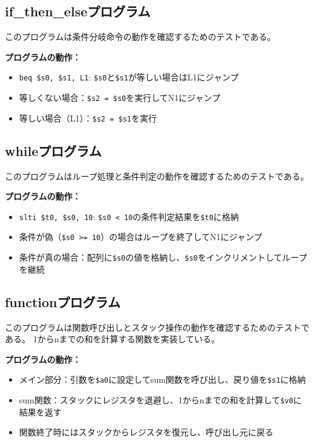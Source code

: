 \documentclass[dvipdfmx]{jsarticle}
\begin{document}
\subsection{if\_then\_elseプログラム}
\label{appendix:if_then_else_asm}
このプログラムは条件分岐命令の動作を確認するためのテストである。



\textbf{プログラムの動作：}
\begin{itemize}
\item \texttt{beq \$s0, \$s1, L1}: \texttt{\$s0}と\texttt{\$s1}が等しい場合はL1にジャンプ
\item 等しくない場合：\texttt{\$s2 = \$s0}を実行してN1にジャンプ
\item 等しい場合（L1）：\texttt{\$s2 = \$s1}を実行
\end{itemize}

\subsection{whileプログラム}
\label{appendix:while_asm}
このプログラムはループ処理と条件判定の動作を確認するためのテストである。



\textbf{プログラムの動作：}
\begin{itemize}
\item \texttt{slti \$t0, \$s0, 10}: \texttt{\$s0 < 10}の条件判定結果を\texttt{\$t0}に格納
\item 条件が偽（\texttt{\$s0 >= 10}）の場合はループを終了してN1にジャンプ
\item 条件が真の場合：配列に\texttt{\$s0}の値を格納し、\texttt{\$s0}をインクリメントしてループを継続
\end{itemize}

\subsection{functionプログラム}
\label{appendix:function_asm}
このプログラムは関数呼び出しとスタック操作の動作を確認するためのテストである。
1からnまでの和を計算する関数を実装している。



\textbf{プログラムの動作：}
\begin{itemize}
\item メイン部分：引数を\texttt{\$a0}に設定してsum関数を呼び出し、戻り値を\texttt{\$s1}に格納
\item sum関数：スタックにレジスタを退避し、1からnまでの和を計算して\texttt{\$v0}に結果を返す
\item 関数終了時にはスタックからレジスタを復元し、呼び出し元に戻る
\end{itemize}
\end{document}
